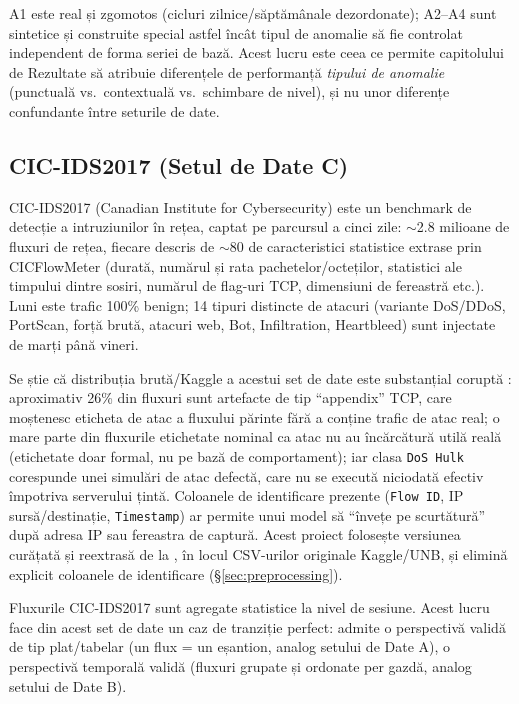 A1 este real și zgomotos (cicluri zilnice/săptămânale dezordonate); A2--A4 sunt sintetice și construite special astfel încât tipul de anomalie să fie controlat independent de forma seriei de bază. Acest lucru este ceea ce permite capitolului de Rezultate să atribuie diferențele de performanță \emph{tipului de anomalie} (punctuală vs.\ contextuală vs.\ schimbare de nivel), și nu unor diferențe confundante între seturile de date.

\subsection{CIC-IDS2017 (Setul de Date C)}

CIC-IDS2017 (Canadian Institute for Cybersecurity) este un benchmark de detecție a intruziunilor în rețea, captat pe parcursul a cinci zile: $\sim$2.8 milioane de fluxuri de rețea, fiecare descris de $\sim$80 de caracteristici statistice extrase prin CICFlowMeter (durată, numărul și rata pachetelor/octeților, statistici ale timpului dintre sosiri, numărul de flag-uri TCP, dimensiuni de fereastră etc.). Luni este trafic 100\% benign; 14 tipuri distincte de atacuri (variante DoS/DDoS, PortScan, forță brută, atacuri web, Bot, Infiltration, Heartbleed) sunt injectate de marți până vineri.

Se știe că distribuția brută/Kaggle a acestui set de date este substanțial coruptă \parencite{engelen2021troubleshooting}: aproximativ 26\% din fluxuri sunt artefacte de tip \enquote{appendix} TCP, care moștenesc eticheta de atac a fluxului părinte fără a conține trafic de atac real; o mare parte din fluxurile etichetate nominal ca atac nu au încărcătură utilă reală (etichetate doar formal, nu pe bază de comportament); iar clasa \texttt{DoS Hulk} corespunde unei simulări de atac defectă, care nu se execută niciodată efectiv împotriva serverului țintă. Coloanele de identificare prezente (\texttt{Flow ID}, IP sursă/destinație, \texttt{Timestamp}) ar permite unui model să \enquote{învețe pe scurtătură} după adresa IP sau fereastra de captură. Acest proiect folosește versiunea curățată și reextrasă de la \textcite{engelen2021troubleshooting}, în locul CSV-urilor originale Kaggle/UNB, și elimină explicit coloanele de identificare (\S\ref{sec:preprocessing}).

Fluxurile CIC-IDS2017 sunt agregate statistice la nivel de sesiune. Acest lucru face din acest set de date un caz de tranziție perfect: admite o perspectivă validă de tip plat/tabelar (un flux = un eșantion, analog setului de Date A), o perspectivă temporală validă (fluxuri grupate și ordonate per gazdă, analog setului de Date B).